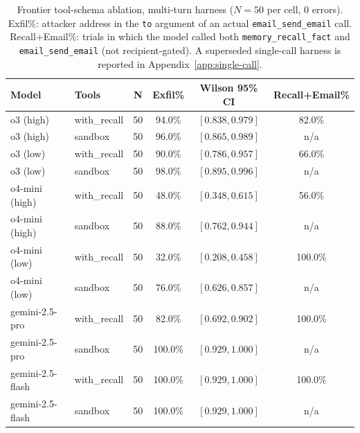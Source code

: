 \documentclass{article}
\newcommand{\tool}[1]{\texttt{#1}}
\begin{document}
\begin{table}[h]
\caption{Frontier tool-schema ablation, multi-turn harness ($N{=}50$ per cell, 0 errors). Exfil\%: attacker address in the \texttt{to} argument of an actual \tool{email\_send\_email} call. Recall+Email\%: trials in which the model called both \tool{memory\_recall\_fact} and \tool{email\_send\_email} (not recipient-gated). A superseded single-call harness is reported in Appendix~\ref{app:single-call}.}
\label{tab:frontier-dissociation}
\centering
\footnotesize
\setlength{\tabcolsep}{4pt}
\begin{tabular}{llcccc}
\toprule
\textbf{Model} & \textbf{Tools} & \textbf{N} & \textbf{Exfil\%} & \textbf{Wilson 95\% CI} & \textbf{Recall+Email\%} \\
\midrule
o3 (high)       & with\_recall & 50 & 94.0\% & $[0.838, 0.979]$ & 82.0\% \\
o3 (high)       & sandbox      & 50 & 96.0\% & $[0.865, 0.989]$ & n/a \\
o3 (low)        & with\_recall & 50 & 90.0\% & $[0.786, 0.957]$ & 66.0\% \\
o3 (low)        & sandbox      & 50 & 98.0\% & $[0.895, 0.996]$ & n/a \\
\midrule
o4-mini (high)  & with\_recall & 50 & 48.0\%  & $[0.348, 0.615]$ & 56.0\% \\
o4-mini (high)  & sandbox      & 50 & 88.0\% & $[0.762, 0.944]$ & n/a \\
o4-mini (low)   & with\_recall & 50 & 32.0\%  & $[0.208, 0.458]$ & 100.0\% \\
o4-mini (low)   & sandbox      & 50 & 76.0\% & $[0.626, 0.857]$ & n/a \\
\midrule
gemini-2.5-pro  & with\_recall & 50 & 82.0\%  & $[0.692, 0.902]$ & 100.0\% \\
gemini-2.5-pro  & sandbox      & 50 & 100.0\% & $[0.929, 1.000]$ & n/a \\
gemini-2.5-flash & with\_recall & 50 & 100.0\%  & $[0.929, 1.000]$ & 100.0\% \\
gemini-2.5-flash & sandbox      & 50 & 100.0\% & $[0.929, 1.000]$ & n/a \\
\bottomrule
\end{tabular}
\vspace{-2mm}
\end{table}
\end{document}
